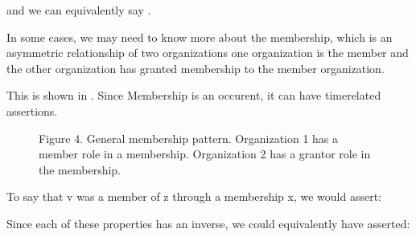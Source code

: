 \documentclass[letterpaper,10pt,english]{sphinxmanual}
\begin{document}
\begin{sphinxVerbatim}[commandchars=\\\{\}]
  
\end{sphinxVerbatim}

\sphinxAtStartPar
and we can equivalently say  \sphinxfootnotemark[2].

\sphinxAtStartPar
In some cases, we may need to know more about the membership, which is an
asymmetric relationship of two organizations \textendash{} one organization is the member
and the other organization has granted membership to the member organization.

\sphinxAtStartPar
This is shown in {\hyperref[\detokenize{associations:figure-4}]{}}.  Since Membership is an occurent, it can have
time\sphinxhyphen{}related assertions.

\begin{figure}[htbp]
\centering
\capstart

\noindent{}
\caption{Figure 4.  General membership pattern.  Organization 1 has a member role in a
membership.  Organization 2 has a grantor role in the membership.}\label{\detokenize{associations:id9}}\label{\detokenize{associations:figure-4}}\end{figure}

\sphinxAtStartPar
To say that v was a member of z through a membership x, we would assert:

\begin{sphinxVerbatim}[commandchars=\\\{\}]
  
  
  
  
  
  
  
\end{sphinxVerbatim}

\sphinxAtStartPar
Since each of these properties has an inverse, we could equivalently have asserted:

\begin{sphinxVerbatim}[commandchars=\\\{\}]
  
  
  
  
  
  
  
\end{sphinxVerbatim}
\end{document}
